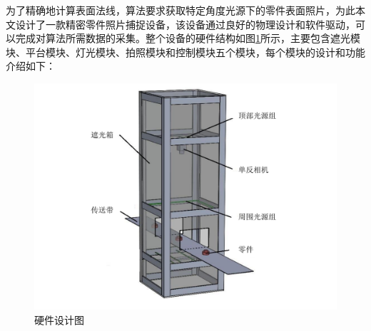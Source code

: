 为了精确地计算表面法线，算法要求获取特定角度光源下的零件表面照片，为此本文设计了一款精密零件照片捕捉设备，该设备通过良好的物理设计和软件驱动，可以完成对算法所需数据的采集。整个设备的硬件结构如图\ref{fig:zheguangmoku}所示，主要包含遮光模块、平台模块、灯光模块、拍照模块和控制模块五个模块，每个模块的设计和功能介绍如下：
\begin{figure}[htbp]
\centering
\includegraphics[width=0.5\linewidth]{figures/zheguangmokuai.pdf}
\caption{硬件设计图}
\label{fig:zheguangmoku}
\end{figure}
